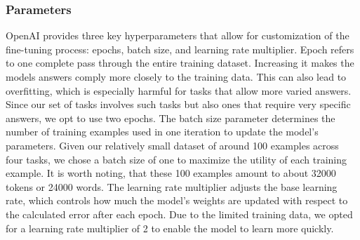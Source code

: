 \subsubsection{Parameters}
OpenAI provides three key hyperparameters that allow for customization of the fine-tuning process: epochs, batch size, and learning rate multiplier. Epoch refers to one complete pass through the entire training dataset. Increasing it makes the models answers comply more closely to the training data. This can also lead to overfitting, which is especially harmful for tasks that allow more varied answers. Since our set of tasks involves such tasks but also ones that require very specific answers, we opt to use two epochs. The batch size parameter determines the number of training examples used in one iteration to update the model’s parameters. Given our relatively small dataset of around 100 examples across four tasks, we chose a batch size of one to maximize the utility of each training example. It is worth noting, that these 100 examples amount to about 32000 tokens or 24000 words. The learning rate multiplier adjusts the base learning rate, which controls how much the model’s weights are updated with respect to the calculated error after each epoch. Due to the limited training data, we opted for a learning rate multiplier of 2 to enable the model to learn more quickly. 

